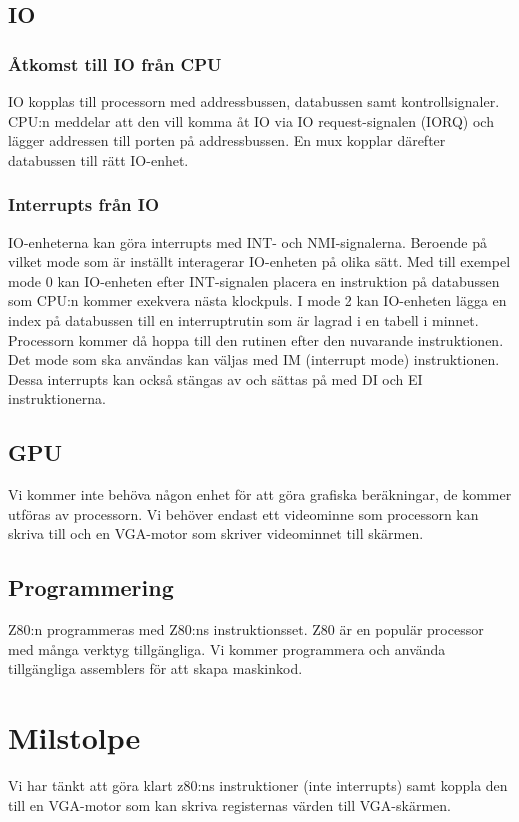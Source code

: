 \documentclass[12pt]{article}
\begin{document}
\subsection{IO}
\subsubsection{Åtkomst till IO från CPU}
IO kopplas till processorn med addressbussen, databussen samt kontrollsignaler.
CPU:n meddelar att den vill komma åt IO via IO request-signalen (IORQ) och
lägger addressen till porten på addressbussen. En mux kopplar därefter
databussen till rätt IO-enhet. 

\subsubsection{Interrupts från IO}
IO-enheterna kan göra interrupts med INT- och NMI-signalerna. Beroende på
vilket mode som är inställt interagerar IO-enheten på olika sätt. Med till
exempel mode 0 kan IO-enheten efter INT-signalen placera en instruktion på
databussen som CPU:n kommer exekvera nästa klockpuls. I mode 2 kan IO-enheten
lägga en index på databussen till en interruptrutin som är lagrad i en tabell i
minnet.  Processorn kommer då hoppa till den rutinen efter den nuvarande
instruktionen.  Det mode som ska användas kan väljas med IM (interrupt mode)
instruktionen.  Dessa interrupts kan också stängas av och sättas på med DI och
EI instruktionerna.

\subsection{GPU}
Vi kommer inte behöva någon enhet för att göra grafiska beräkningar, de kommer
utföras av processorn. Vi behöver endast ett videominne som processorn kan
skriva till och en VGA-motor som skriver videominnet till skärmen.

\subsection{Programmering}
Z80:n programmeras med Z80:ns instruktionsset. Z80 är en populär processor med
många verktyg tillgängliga. Vi kommer programmera och använda tillgängliga
assemblers för att skapa maskinkod.

\section{Milstolpe}
Vi har tänkt att göra klart z80:ns instruktioner (inte interrupts) samt koppla
den till en VGA-motor som kan skriva registernas värden till VGA-skärmen.
\end{document}
